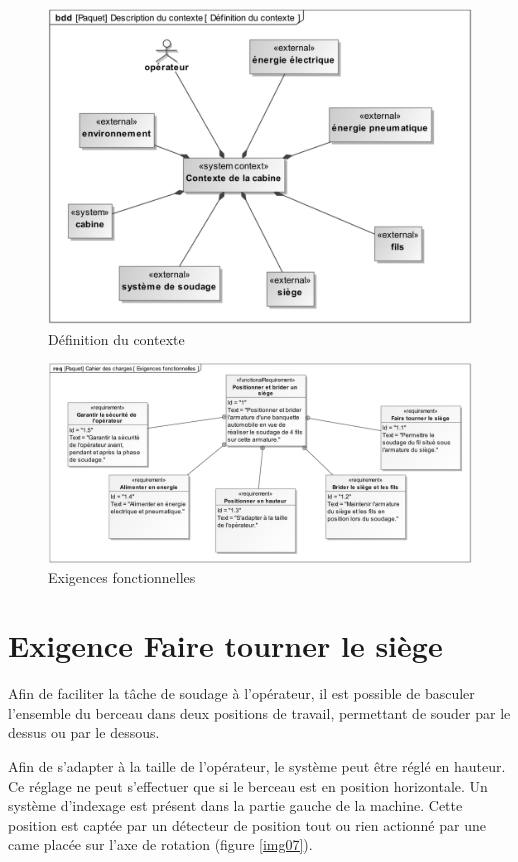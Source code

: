 \begin{figure}[!h]
\centering\includegraphics[width=\linewidth]{img/fig05}
 \caption{Définition du contexte}
 \label{img05}
\end{figure}

\begin{figure}[!h]
\centering\includegraphics[width=\linewidth]{img/fig06}
 \caption{Exigences fonctionnelles}
 \label{img06}
\end{figure}

\clearpage

\section{Exigence \og Faire tourner le siège \fg}

Afin de faciliter la tâche de soudage à l’opérateur, il est possible de basculer l’ensemble du berceau dans deux positions de travail, permettant de souder par le dessus ou par le dessous.

Afin de s’adapter à la taille de l’opérateur, le système peut être réglé en hauteur. Ce réglage ne peut s’effectuer que si le berceau est en position horizontale. Un système d’indexage est présent dans la partie gauche de la machine. Cette position est captée par un détecteur de position tout ou rien actionné par une came placée sur l’axe de rotation (figure \ref{img07}).

